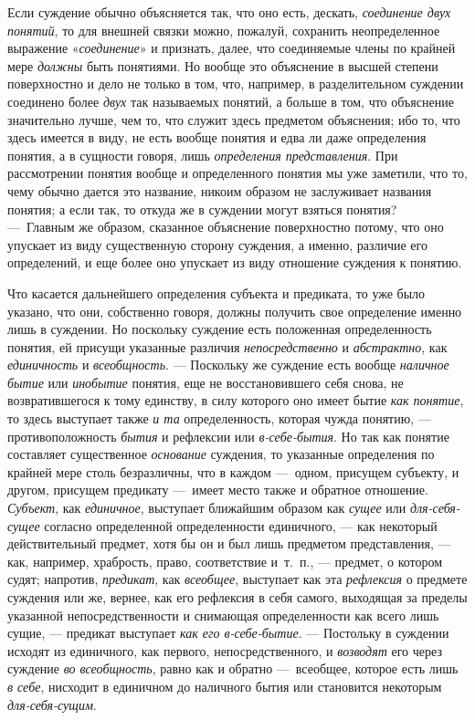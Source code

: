 \documentclass[twoside]{article}
\begin{document}
{{{{Если суждение обычно объясняется так, что оно есть, дескать,
{\em соединение двух понятий},
то для внешней связки можно, пожалуй, сохранить
неопределенное выражение
«{\em соединение}» и
признать, далее, что соединяемые члены по крайней мере
{\em должны} быть
понятиями. Но вообще это объяснение в высшей степени поверхностно и дело не
только в том, что, например, в разделительном суждении соединено более
{\em двух} так называемых
понятий, а больше в том, что объяснение значительно лучше, чем то, что
служит здесь предметом объяснения; ибо то, что здесь имеется в виду, не
есть вообще понятия и едва ли даже определения понятия, а в сущности
говоря, лишь {\em определения
представления}. При рассмотрении понятия вообще и
определенного понятия мы уже заметили, что то, чему обычно дается это
название, никоим образом не заслуживает названия понятия; а если так, то
откуда же в суждении могут взяться понятия? —~Главным же
образом, сказанное объяснение поверхностно потому, что оно упускает из виду
существенную сторону суждения, а именно, различие его определений, и еще
более оно упускает из виду отношение суждения к понятию.

Что касается дальнейшего определения субъекта и предиката, то
уже было указано, что они, собственно говоря, должны получить свое
определение именно лишь в суждении. Но поскольку суждение есть положенная
определенность понятия, ей присущи указанные различия
{\em непосредственно} и
{\em абстрактно}, как
{\em единичность} и
{\em всеобщность}. —
Поскольку же суждение есть вообще
{\em наличное бытие} или
{\em инобытие} понятия,
еще не восстановившего себя снова, не возвратившегося к тому единству, в
силу которого оно имеет бытие {\em как
понятие}, то здесь выступает также
{\em и та}
определенность, которая чужда понятию, —
противоположность
{\em бытия} и рефлексии
или {\em в-себе-бытия}.
Но так как понятие составляет существенное
{\em основание} суждения,
то указанные определения по крайней мере столь безразличны, что в каждом
—~одном, присущем субъекту, и другом, присущем предикату
—~имеет место также и обратное отношение.
{\em Субъект}, как
{\em единичное},
выступает ближайшим образом как
{\em сущее} или
{\em для-себя-сущее}
согласно определенной определенности единичного, —
как некоторый действительный предмет, хотя бы он и был лишь
предметом представления, — как, например, храбрость, право,
соответствие и~т.~п., — предмет, о котором судят; напротив,
{\em предикат}, как
{\em всеобщее}, выступает
как эта {\em рефлексия} о
предмете суждения или же, вернее, как его рефлексия в себя самого,
выходящая за пределы указанной непосредственности и снимающая
определенности как всего лишь сущие, — предикат выступает
{\em как его в-себе-бытие}. —
Постольку в суждении исходят из единичного, как первого,
непосредственного, и {\em возводят}
его через суждение {\em во
всеобщность}, равно как и обратно —~всеобщее,
которое есть лишь {\em в себе},
нисходит в единичном до наличного бытия или становится
некоторым {\em для-себя-сущим}.

}}}}
\end{document}
